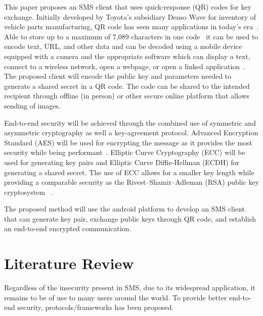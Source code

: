 \documentclass[journal]{./IEEE/IEEEtran}
\begin{document}
This paper proposes an SMS client that uses
quick-response (QR) codes for key exchange. Initially developed by Toyota's
subsidiary Denso Wave for inventory of vehicle parts manufacturing,
QR code has seen many applications in today's era~\cite{Tiwari_2016}.
Able to store up to a maximum of 7,089 characters in one code~\cite{qrcode}
it can be used to encode text, URL, and other data and can be decoded using
a mobile device equipped with a camera and the appropriate software which can
display a text, connect to a wireless network, open a webpage, or open a linked
application~\cite{Shin_Jung_Chang_2012}. The proposed client will encode the
public key and parameters needed to generate a shared secret in a QR code. The
code can be shared to the intended recipient through offline (in person)
or other secure online platform that allows sending of images.

End-to-end security will be achieved through the combined use of symmetric and
asymmetric cryptography as well a key-agreement protocol. Advanced Encryption
Standard (AES) will be used for encrypting the message as it provides the
most security while being performant~\cite{Karale_Pendke_Dahiwale_2015}.
Elliptic Curve Cryptography (ECC) will be used for generating key pairs and
Elliptic Curve Diffie-Hellman (ECDH) for generating a shared secret. The use
of ECC allows for a smaller key length while providing a comparable security
as the Rivest–Shamir–Adleman (RSA) public key cryptosystem
~\cite{Amara_Siad_2011}.

The proposed method will use the android platform to develop an SMS client
that can generate key pair, exchange public keys through QR code, and establish
an end-to-end encrypted communication.

\section{Literature Review}
Regardless of the insecurity present in SMS, due to its widespread
application, it remains to be of use to many users around the world.
To provide better end-to-end security, protocols/frameworks has been proposed.
\end{document}

